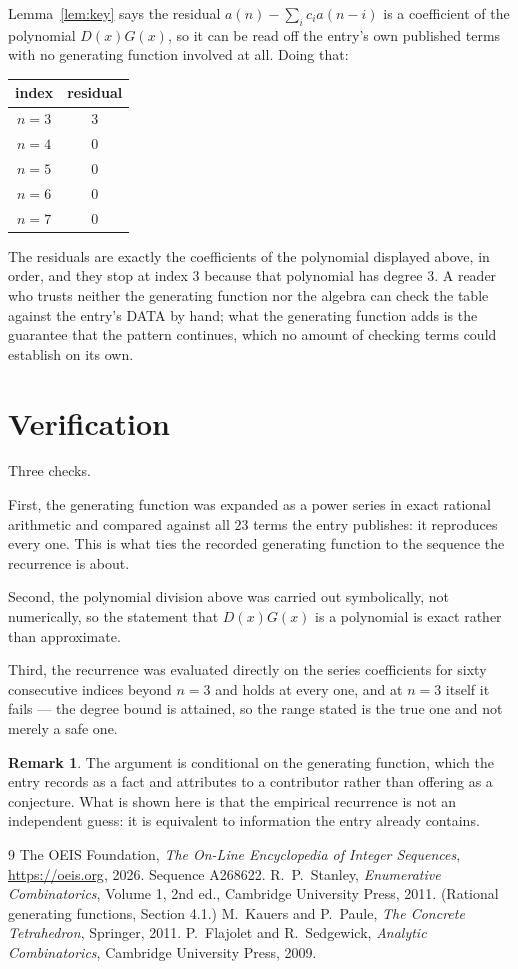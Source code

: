 \documentclass[11pt,a4paper]{article}
\theoremstyle{plain}
\theoremstyle{definition}
\newtheorem{remark}[theorem]{Remark}
\begin{document}
Lemma~\ref{lem:key} says the residual $a(n)-\sum_ic_ia(n-i)$ is a coefficient of the
polynomial $D(x)G(x)$, so it can be read off the entry's own published terms with no
generating function involved at all. Doing that:
\begin{center}
\begin{tabular}{cc}
index & residual \\ \hline
$n=3$ & $3$ \\
$n=4$ & $0$ \\
$n=5$ & $0$ \\
$n=6$ & $0$ \\
$n=7$ & $0$
\end{tabular}
\end{center}
The residuals are exactly the coefficients of the polynomial displayed above, in order, and
they stop at index $3$ because that polynomial has degree $3$. A reader who trusts
neither the generating function nor the algebra can check the table against the entry's DATA
by hand; what the generating function adds is the guarantee that the pattern continues, which
no amount of checking terms could establish on its own.

\section{Verification}

Three checks.

First, the generating function was expanded as a power series in exact rational arithmetic and
compared against all $23$ terms the entry publishes: it reproduces every one. This is
what ties the recorded generating function to the sequence the recurrence is about.

Second, the polynomial division above was carried out symbolically, not numerically, so the
statement that $D(x)G(x)$ is a polynomial is exact rather than approximate.

Third, the recurrence was evaluated directly on the series coefficients for sixty consecutive
indices beyond $n=3$ and holds at every one, and at $n=3$ itself it fails --- the
degree bound is attained, so the range stated is the true one and not merely a safe one.

\begin{remark}
The argument is conditional on the generating function, which the entry records as a fact and
attributes to a contributor rather than offering as a conjecture. What is shown here is that
the empirical recurrence is not an independent guess: it is equivalent to information the
entry already contains.
\end{remark}

\begin{thebibliography}{9}
 The OEIS Foundation, \emph{The On-Line Encyclopedia of Integer
Sequences}, \url{https://oeis.org}, 2026. Sequence A268622.
 R.~P.~Stanley, \emph{Enumerative Combinatorics}, Volume 1, 2nd ed.,
Cambridge University Press, 2011. (Rational generating functions, Section 4.1.)
 M.~Kauers and P.~Paule, \emph{The Concrete Tetrahedron}, Springer, 2011.
 P.~Flajolet and R.~Sedgewick, \emph{Analytic Combinatorics}, Cambridge
University Press, 2009.
\end{thebibliography}
\end{document}
